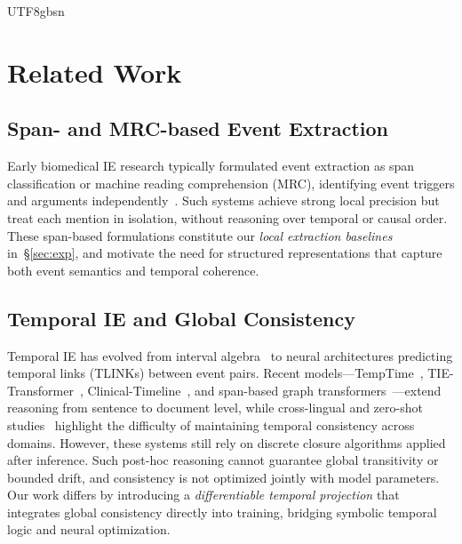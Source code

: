 \documentclass[11pt]{article}
\begin{document}
\begin{CJK*}{UTF8}{gbsn}
\section{Related Work}
\label{sec:related-work}

\subsection{Span- and MRC-based Event Extraction}
Early biomedical IE research typically formulated event extraction as span classification or machine reading comprehension (MRC), identifying event triggers and arguments independently~\cite{lin2020joint,wang2022mlee}. Such systems achieve strong local precision but treat each mention in isolation, without reasoning over temporal or causal order. These span-based formulations constitute our \emph{local extraction baselines} in~\S\ref{sec:exp}, and motivate the need for structured representations that capture both event semantics and temporal coherence.

\subsection{Temporal IE and Global Consistency}
Temporal IE has evolved from interval algebra~\cite{allen1983maintaining} to neural architectures predicting temporal links (TLINKs) between event pairs. Recent models—TempTime~\cite{lin2023temptime}, TIE-Transformer~\cite{su2025transformerTIE}, Clinical-Timeline~\cite{han2023clinicaltimeline}, and span-based graph transformers~\cite{chaturvedi2025temporal}—extend reasoning from sentence to document level, while cross-lingual and zero-shot studies~\cite{kougia2024zeroshotclinicalTRE} highlight the difficulty of maintaining temporal consistency across domains. However, these systems still rely on discrete closure algorithms applied after inference. Such post-hoc reasoning cannot guarantee global transitivity or bounded drift, and consistency is not optimized jointly with model parameters. Our work differs by introducing a \emph{differentiable temporal projection} that integrates global consistency directly into training, bridging symbolic temporal logic and neural optimization.


\end{CJK*}
\end{document}
